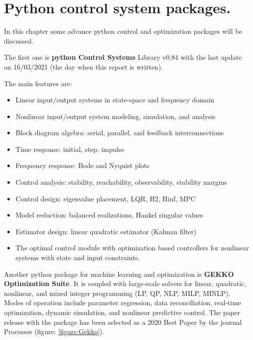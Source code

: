 \section{Python control system packages.}

In this chapter some advance python control and optimization packages will be discussed.

The first one is \textbf{python Control Systems} Library v0.84 \cite{Control_Lib} \cite{GitControl_Lib} with the last update on 16/03/2021 (the day when this report is written).

The main features are: 

\begin{itemize}
    \item Linear input/output systems in state-space and frequency domain

    \item Nonlinear input/output system modeling, simulation, and analysis

    \item Block diagram algebra: serial, parallel, and feedback interconnections

    \item Time response: initial, step, impulse

    \item Frequency response: Bode and Nyquist plots

    \item Control analysis: stability, reachability, observability, stability margins

    \item Control design: eigenvalue placement, LQR, H2, Hinf, MPC

    \item Model reduction: balanced realizations, Hankel singular values

    \item Estimator design: linear quadratic estimator (Kalman filter)
    
    \item The optimal control module with optimization based controllers for nonlinear systems with state and input constraints.

\end{itemize}

Another python package for machine learning and optimization is \textbf{GEKKO Optimization Suite}\cite{gekko2018}. It is coupled with large-scale solvers for linear, quadratic, nonlinear, and mixed integer programming (LP, QP, NLP, MILP, MINLP). Modes of operation include parameter regression, data reconciliation, real-time optimization, dynamic simulation, and nonlinear predictive control. The paper release with the package has been selected as a 2020 Best Paper by the journal Processes (figure: \ref{figure:Gekko}). 

